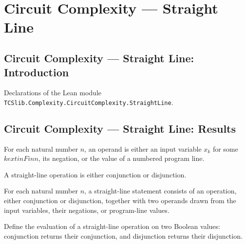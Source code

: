 \section{Circuit Complexity --- Straight Line}
\subsection*{Circuit Complexity --- Straight Line: Introduction}

Declarations of the Lean module \texttt{TCSlib.Complexity.CircuitComplexity.StraightLine}.

\subsection*{Circuit Complexity --- Straight Line: Results}

\begin{definition}
\label{BoolCircuit.SLOperand}
\leanok
For each natural number $n$, an operand is either an input variable $x_k$ for some
$k	ext{ in Fin }n$, its negation, or the value of a numbered program line.
\end{definition}

\begin{definition}
\label{BoolCircuit.SLOp}
\leanok
A straight-line operation is either conjunction or disjunction.
\end{definition}

\begin{definition}
\label{BoolCircuit.SLStmt}
\leanok
{}
For each natural number $n$, a straight-line statement consists of an operation, either
conjunction or disjunction, together with two operands drawn from the input variables,
their negations, or program-line values.
\end{definition}

\begin{definition}
\label{BoolCircuit.SLOp.apply}
\leanok
{}
Define the evaluation of a straight-line operation on two Boolean values: conjunction
returns their conjunction, and disjunction returns their disjunction.
\end{definition}

